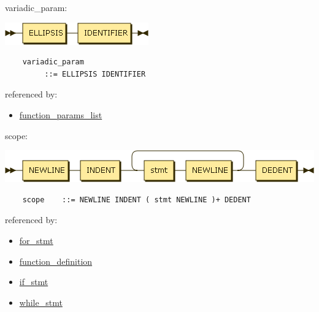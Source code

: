 \begin{minipage}{\textwidth}
    \protect\hypertarget{variadic_param}{}{variadic\_param:}

    \includegraphics[width=2.43750in,height=0.37500in]{diagram/variadic_param.png}

    \begin{verbatim}
    variadic_param
         ::= ELLIPSIS IDENTIFIER
    \end{verbatim}

    referenced by:

    \begin{itemize}
            \tightlist
        \item
            \protect\hyperlink{function_params_list}{function\_params\_list}
    \end{itemize}

\end{minipage}

\begin{minipage}{\textwidth}
    \protect\hypertarget{scope}{}{scope:}

    \includegraphics[width=5.25000in,height=0.54167in]{diagram/scope.png}

    \begin{verbatim}
    scope    ::= NEWLINE INDENT ( stmt NEWLINE )+ DEDENT
    \end{verbatim}

    referenced by:

    \begin{itemize}
            \tightlist
        \item
            \protect\hyperlink{for_stmt}{for\_stmt}
        \item
            \protect\hyperlink{function_definition}{function\_definition}
        \item
            \protect\hyperlink{if_stmt}{if\_stmt}
        \item
            \protect\hyperlink{while_stmt}{while\_stmt}
    \end{itemize}

\end{minipage}

